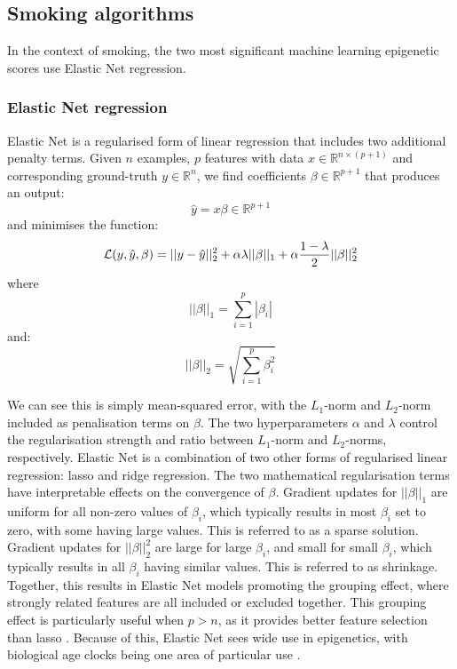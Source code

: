 \documentclass{article} %
\newcommand{\equationname}[1]{%
    \begingroup
        \leavevmode
        \addcontentsline{equ}{equations}{\protect\numberline{\theequation}#1}%
    \endgroup   
}
\begin{document}
\subsection{Smoking algorithms}
In the context of smoking, the two most significant machine learning epigenetic scores use Elastic Net regression.

\subsubsection{Elastic Net regression} \label{sec:lin-elastic-net}
Elastic Net \cite{zou2005regularization} is a regularised form of linear regression that includes two additional penalty terms.
Given \(n\) examples, \(p\) features with data \(x \in \mathbb{R}^{n \times (p + 1)}\) and corresponding ground-truth \(y \in \mathbb{R}^n\), we find coefficients \(\beta \in \mathbb{R}^{p + 1}\) that produces an output:
\[\hat{y} = x \beta \in \mathbb{R}^{p + 1}\]
and minimises the function:
\begin{equation} \equationname{Elastic Net linear regression} \label{eqn:lin_elastic_net}
    \mathcal{L}(y, \hat{y}, \beta) = ||y - \hat{y}||_2^2 + \alpha\lambda||\beta||_1 + \alpha\frac{1 - \lambda}{2}||\beta||_2^2
\end{equation}
where
\[||\beta||_1 = \sum_{i=1}^{p} |\beta_i|\]
and:
\[||\beta||_2 = \sqrt{\sum_{i=1}^{p} \beta_i^2}\]

We can see this is simply mean-squared error, with the \(L_1\)-norm and \(L_2\)-norm included as penalisation terms on \(\beta\). The two hyperparameters \(\alpha\) and \(\lambda\) control the regularisation strength and ratio between \(L_1\)-norm and \(L_2\)-norms, respectively. Elastic Net is a combination of two other forms of regularised linear regression: lasso \cite{tibshirani1996regression} and ridge \cite{hoerl1970ridge} regression. The two mathematical regularisation terms have interpretable effects on the convergence of \(\beta\). Gradient updates for \(||\beta||_1\) are uniform for all non-zero values of \(\beta_i\), which typically results in most \(\beta_i\) set to zero, with some having large values. This is referred to as a sparse solution. Gradient updates for \(||\beta||_2^2\) are large for large \(\beta_i\), and small for small \(\beta_i\), which typically results in all \(\beta_i\) having similar values. This is referred to as shrinkage. Together, this results in Elastic Net models promoting the grouping effect, where strongly related features are all included or excluded together. This grouping effect is particularly useful when \(p > n\), as it provides better feature selection than lasso \cite{zou2005regularization}. Because of this, Elastic Net sees wide use in epigenetics, with biological age clocks being one area of particular use \cite{teschendorff2025epigenetic}.
\end{document}
